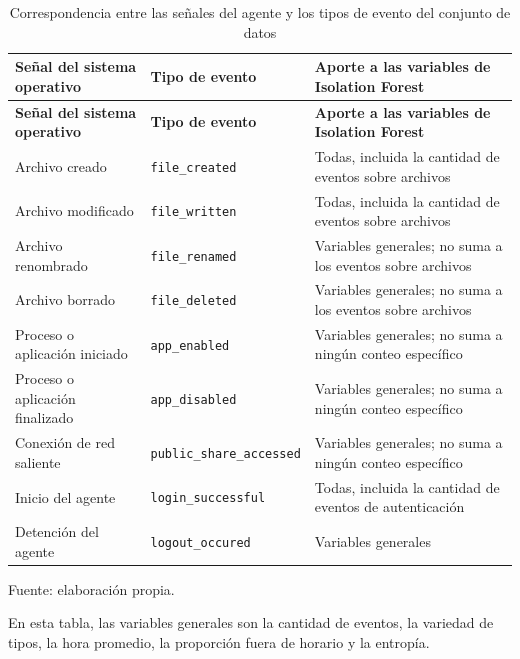 \begin{longtable}{>{\raggedright\arraybackslash}p{3.6cm}>{\raggedright\arraybackslash}p{3.8cm}>{\raggedright\arraybackslash}p{6.7cm}}
	\caption{Correspondencia entre las señales del agente y los tipos de evento del conjunto de datos}
	\label{tab:mapeo-agente}\\
	\hline
	\textbf{Señal del sistema operativo} & \textbf{Tipo de evento} & \textbf{Aporte a las variables de Isolation Forest} \\
	\hline
	\endfirsthead
	\hline
	\textbf{Señal del sistema operativo} & \textbf{Tipo de evento} & \textbf{Aporte a las variables de Isolation Forest} \\
	\hline
	\endhead
	Archivo creado & \texttt{file\_\allowbreak{}created} & Todas, incluida la cantidad de eventos sobre archivos \\
	\hline
	Archivo modificado & \texttt{file\_\allowbreak{}written} & Todas, incluida la cantidad de eventos sobre archivos \\
	\hline
	Archivo renombrado & \texttt{file\_\allowbreak{}renamed} & Variables generales; no suma a los eventos sobre archivos \\
	\hline
	Archivo borrado & \texttt{file\_\allowbreak{}deleted} & Variables generales; no suma a los eventos sobre archivos \\
	\hline
	Proceso o aplicación iniciado & \texttt{app\_\allowbreak{}enabled} & Variables generales; no suma a ningún conteo específico \\
	\hline
	Proceso o aplicación finalizado & \texttt{app\_\allowbreak{}disabled} & Variables generales; no suma a ningún conteo específico \\
	\hline
	Conexión de red saliente & \texttt{public\_\allowbreak{}share\_\allowbreak{}accessed} & Variables generales; no suma a ningún conteo específico \\
	\hline
	Inicio del agente & \texttt{login\_\allowbreak{}successful} & Todas, incluida la cantidad de eventos de autenticación \\
	\hline
	Detención del agente & \texttt{logout\_\allowbreak{}occured} & Variables generales \\
	\hline
\end{longtable}
{\small Fuente: elaboración propia.\par}

En esta tabla, las variables generales son la cantidad de eventos, la variedad de tipos, la hora promedio, la proporción fuera de horario y la entropía.

